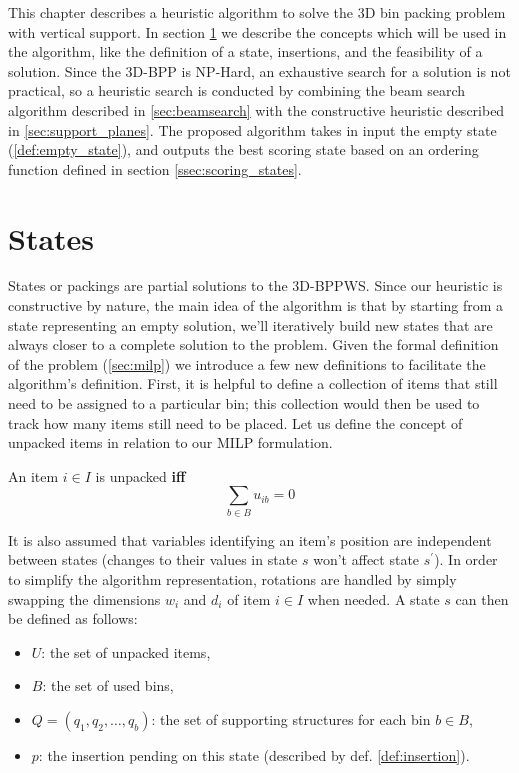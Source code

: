 This chapter describes a heuristic algorithm to solve the 3D bin packing problem with vertical support.
In section \ref{sec:problem_state} we describe the concepts which will be used in the algorithm, like the definition of a state, insertions, and the feasibility of a solution.
Since the 3D-BPP is NP-Hard, an exhaustive search for a solution is not practical, so a heuristic search is conducted by combining the beam search algorithm described in \cref{sec:beamsearch} with the constructive heuristic described in \cref{sec:support_planes}.
The proposed algorithm takes in input the empty state (\ref{def:empty_state}), and outputs the best scoring state based on an ordering function defined in section \ref{ssec:scoring_states}.

\section{States}
\label{sec:problem_state}%
States or packings are partial solutions to the 3D-BPPWS. Since our heuristic is constructive by nature, the main idea of the algorithm is that by starting from a state representing an empty solution, we'll iteratively build new states that are always closer to a complete solution to the problem.
Given the formal definition of the problem (\ref{sec:milp}) we introduce a few new definitions to facilitate the algorithm's definition.
First, it is helpful to define a collection of items that still need to be assigned to a particular bin; this collection would then be used to track how many items still need to be placed.
Let us define the concept of unpacked items in relation to our MILP formulation.
\begin{definition}
    An item $i \in I$ is unpacked \textbf{iff}
    \begin{equation*}
        \sum_{b \in B} u_{ib} = 0
    \end{equation*}
\end{definition}

It is also assumed that variables identifying an item's position are independent between states (changes to their values in state $s$ won't affect state $s^\prime$).
In order to simplify the algorithm representation, rotations are handled by simply swapping the dimensions $w_i$ and $d_i$ of item $i \in I$ when needed.
A state $s$ can then be defined as follows:
\begin{itemize}
    \item $U$: the set of unpacked items,
    \item $B$: the set of used bins,
    \item $Q = (q_1, q_2,\dots, q_b)$: the set of supporting structures for each bin $b \in B$,
    \item $p$: the insertion pending on this state (described by def. \ref{def:insertion}).
\end{itemize}

